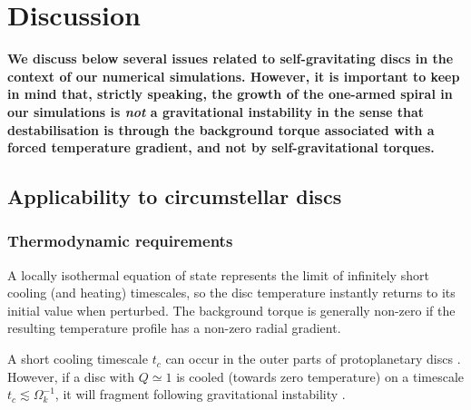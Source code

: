 
\section{Discussion}\label{discussions} 
{\bf
  We discuss below several issues related to self-gravitating
  discs in the context of our numerical simulations. However, it is
  important to keep in mind that, strictly speaking, 
  the growth of the one-armed spiral in our simulations is
  \emph{not} a gravitational instability in the sense that
  destabilisation is through the background torque associated with a
  forced temperature gradient, and not by self-gravitational torques.     
}

{\bf
  \subsection{Applicability to circumstellar discs}
  
  \subsubsection{Thermodynamic requirements}  

  A locally isothermal equation of state represents the limit
  of infinitely short cooling (and heating) timescales, so the 
  disc temperature instantly returns to its initial value when 
  perturbed. The background torque is generally non-zero if the 
  resulting temperature profile has a non-zero radial gradient.  
  
  A short cooling timescale $t_c$ can occur in the outer
  parts of protoplanetary discs 
  \citep{rafikov05,clarke09,rice09,cossins10b}.  %
  However, if a disc with $Q\simeq 1$ is cooled (towards zero
  temperature) on a timescale $t_c\lesssim\Omega_k^{-1}$, it will
  fragment following gravitational instability
  \citep{gammie01,rice05,paardekooper12}.  
  
}
